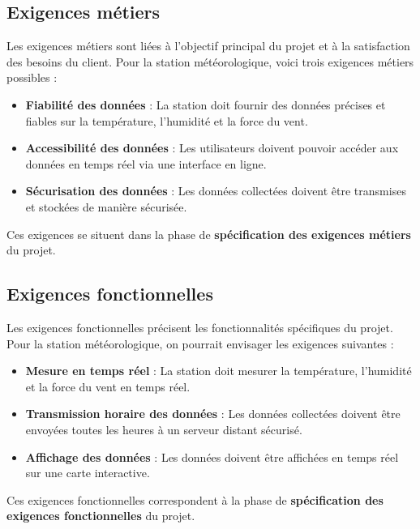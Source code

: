 \documentclass[titlepage]{article}
\begin{document}
	\subsection{Exigences métiers}
	Les exigences métiers sont liées à l'objectif principal du projet et à la satisfaction des besoins du client. Pour la station météorologique, voici trois exigences métiers possibles :
	\begin{itemize}
		\item \textbf{Fiabilité des données} : La station doit fournir des données précises et fiables sur la température, l'humidité et la force du vent.
		\item \textbf{Accessibilité des données} : Les utilisateurs doivent pouvoir accéder aux données en temps réel via une interface en ligne.
		\item \textbf{Sécurisation des données} : Les données collectées doivent être transmises et stockées de manière sécurisée.
	\end{itemize}
	Ces exigences se situent dans la phase de \textbf{spécification des exigences métiers} du projet.

	\subsection{Exigences fonctionnelles}
	Les exigences fonctionnelles précisent les fonctionnalités spécifiques du projet. Pour la station météorologique, on pourrait envisager les exigences suivantes :
	\begin{itemize}
		\item \textbf{Mesure en temps réel} : La station doit mesurer la température, l'humidité et la force du vent en temps réel.
		\item \textbf{Transmission horaire des données} : Les données collectées doivent être envoyées toutes les heures à un serveur distant sécurisé.
		\item \textbf{Affichage des données} : Les données doivent être affichées en temps réel sur une carte interactive.
	\end{itemize}
	Ces exigences fonctionnelles correspondent à la phase de \textbf{spécification des exigences fonctionnelles} du projet.
\end{document}
